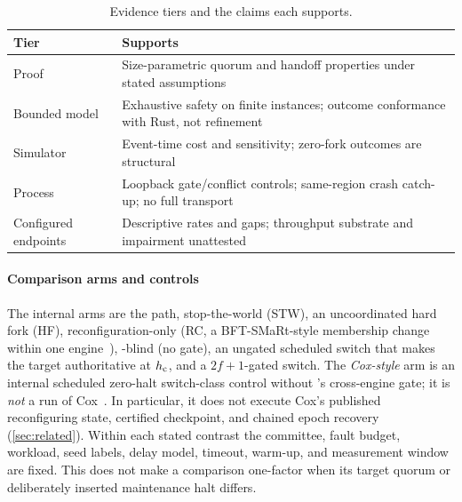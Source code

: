 \begin{table}[t]
\centering
\caption{Evidence tiers and the claims each supports.}
\label{tab:tiers}
\small
\renewcommand{\arraystretch}{1.14}
\begin{tabular}{@{}L{0.25\columnwidth}L{0.69\columnwidth}@{}}
\toprule
\textbf{Tier} & \textbf{Supports} \\
\midrule
Proof & Size-parametric quorum and handoff properties under stated assumptions \\
Bounded model & Exhaustive safety on finite instances; outcome conformance with Rust, not refinement \\
Simulator & Event-time cost and sensitivity; zero-fork outcomes are structural \\
Process & Loopback gate/conflict controls; same-region crash catch-up; no full transport \\
Configured endpoints & Descriptive rates and gaps; throughput substrate and impairment unattested \\
\bottomrule
\end{tabular}
\end{table}


\paragraph{Comparison arms and controls}
The internal arms are the \sage{} path, stop-the-world (STW), an uncoordinated hard fork (HF),
reconfiguration-only (RC, a BFT-SMaRt-style membership change within one engine~\cite{bftsmart}),
\sage-blind (no gate), an ungated scheduled switch that makes the target authoritative at $h_{\mathrm c}$,
and a $2f{+}1$-gated switch. The \emph{Cox-style} arm is an internal
scheduled zero-halt switch-class control without \sage's cross-engine gate;
it is \emph{not} a run of Cox~\cite{cox}. In particular, it does not execute
Cox's published reconfiguring state, certified checkpoint, and chained epoch
recovery (\cref{sec:related}).
Within each stated contrast the committee, fault budget, workload, seed
labels, delay model, timeout, warm-up, and measurement window are fixed. This does not make a
comparison one-factor when its target quorum or deliberately inserted maintenance halt differs.

